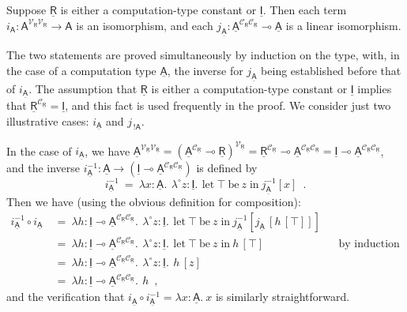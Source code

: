 \documentclass{LMCS}
\newcommand{\comptype}[1]{\underline{#1}}
\newcommand{\VA}{\mathsf{A}}
\newcommand{\CA}{\comptype{\mathsf{A}}}
\newcommand{\CR}{\comptype{\mathsf{R}}}
\newcommand{\CI}{\comptype{\mathsf{I}}}
\newcommand{\Vfun}{\to}
\newcommand{\lpop}{\multimap}
\newcommand{\Cbang}[1]{{! #1}}
\newcommand{\In}[2]{#1 \colon  \! #2}
\newcommand{\Vlam}[3]{\lambda \In{#1}{#2}.\: #3}
\newcommand{\Itop}{\top}
\newcommand{\Ilet}[2]{\mathrm{let}\: {\Itop}\:\mathrm{be}\:{#1} \;\mathrm{in}\: #2}
\newcommand{\llambda}{\lambda^{\!\circ\!}}
\newcommand{\llam}[3]{\llambda \In{#1}{#2}.\: #3}
\newcommand{\lappl}[2]{#1[#2]}
\newcommand{\CpsVT}[1]{#1^{\mathcal{V}_{\CR}}}
\newcommand{\CpsCT}[1]{#1^{\mathcal{C}_{\CR}}}
\newcommand{\CpsVVT}[1]{#1^{\mathcal{V}_{\CR}\mathcal{V}_{\CR}}}
\newcommand{\CpsCCT}[1]{#1^{\mathcal{C}_{\CR}\mathcal{C}_{\CR}}}
\newcommand{\Viso}[1]{i_{#1}}
\newcommand{\Ciso}[1]{j_{#1}}
\begin{document}
\begin{lem}
Suppose $\CR$ is either a computation-type constant or $\CI$. Then
each term $\Viso{\VA} \colon \CpsVVT{\VA} \Vfun \VA$ is an isomorphism, and each
$\Ciso{\CA} \colon \CpsCCT{\CA} \lpop \CA$
is a linear isomorphism.
\end{lem}

\proof
The two statements are proved simultaneously by induction on the type,
with, in the case of a computation type $\CA$, the inverse
for $\Ciso{\CA}$ being established before that of $\Viso{\CA}$.
The assumption that $\CR$ is either a computation-type constant or $\CI$ implies
that $\CpsCT{\CR} = \CI$, and this fact is used frequently
in the proof. We consider just two illustrative cases:
$\Viso{\CA}$ and $\Ciso{\,\Cbang{\VA}}$.

In the case of  $\Viso{\CA}$, we have $\CpsVVT{\CA} = \CpsVT{(\CpsCT{\CA} \lpop \CR)}
= \CpsCT{\CR} \lpop \CpsCCT{\CA} = \CI \lpop \CpsCCT{\CA}$,
and the inverse $\Viso{\CA}^{-1} \colon \CA \Vfun (\CI \lpop \CpsCCT{\CA})$ is defined 
by
\[
\Viso{\CA}^{-1} \: = \: \Vlam{x}{\CA}{\,\llam{z}{\CI}{\, \Ilet{z}{\lappl{\Ciso{\CA}^{-1}}{x}}}} \enspace .
\]
Then we have (using the obvious definition for composition):
\begin{align*}
\Viso{\CA}^{-1} \circ \Viso{\CA} \:
& = \:
\Vlam{h}{\CI \lpop \CpsCCT{\CA}}{\,\llam{z}{\CI}{\, \Ilet{z}{\lappl{\Ciso{\CA}^{-1}}{\lappl{\Ciso{\CA}\,}{\lappl{h\,}{\Itop}}}}}} 
\\
& = \:
\Vlam{h}{\CI \lpop \CpsCCT{\CA}}{\,\llam{z}{\CI}{\, \Ilet{z}{\lappl{h\,}{\Itop}}}} 
& & \text{by induction hypothesis}
\\
& = \:
\Vlam{h}{\CI \lpop \CpsCCT{\CA}}{\,\llam{z}{\CI}{\, \lappl{h\,}{z}}} 
\\
& = \:
\Vlam{h}{\CI \lpop \CpsCCT{\CA}}{\,h} \enspace ,
\end{align*}
and the verification that 
$\Viso{\CA} \circ \Viso{\CA}^{-1} = \Vlam{x}{\!\CA}{x}$ is similarly straightforward.
\end{document}
